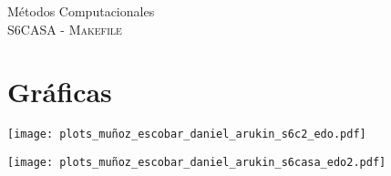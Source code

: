 \documentclass[11pt,letterpaper]{article}
\begin{document}
\begin{center}
{\Large Métodos Computacionales} \\
S6CASA - \textsc{Makefile}\\
\end{center}


\noindent
\section{Gr\'aficas}
\begin{center}
\texttt{[image: plots\_muñoz\_escobar\_daniel\_arukin\_s6c2\_edo.pdf]} 
\begin{center}
\end{center}
\texttt{[image: plots\_muñoz\_escobar\_daniel\_arukin\_s6casa\_edo2.pdf]} 
\end{center}
\end{document}
